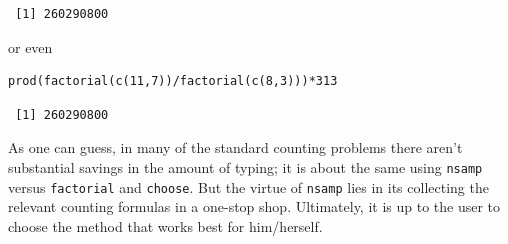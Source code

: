 \documentclass[captions=tableheading]{scrbook}
\begin{document}
\begin{example}
\begin{verbatim}
 [1] 260290800
\end{verbatim}

or even 


\begin{verbatim}
prod(factorial(c(11,7))/factorial(c(8,3)))*313
\end{verbatim}

\begin{verbatim}
 [1] 260290800
\end{verbatim}

\end{example}

As one can guess, in many of the standard counting problems there aren't substantial savings in the amount of typing; it is about the same using \texttt{nsamp} versus \texttt{factorial} and \texttt{choose}. But the virtue of \texttt{nsamp} lies in its collecting the relevant counting formulas in a one-stop shop. Ultimately, it is up to the user to choose the method that works best for him/herself. 
\end{document}
